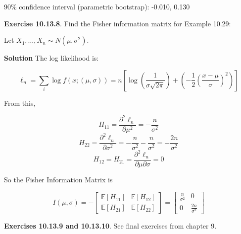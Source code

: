 \begin{console}
90\% confidence interval (parametric bootstrap):          -0.010, 0.130
\end{console}

\textbf{Exercise 10.13.8}. Find the Fisher information matrix for
Example 10.29:

Let \(X_1, \dots, X_n \sim N(\mu, \sigma^2)\).

\textbf{Solution} The log likelihood is:

\[\ell_n = \sum_i \log f(x; (\mu, \sigma))
= n \left[ \log \left( \frac{1}{\sigma \sqrt{2 \pi}} \right) + \left( -\frac{1}{2} \left(\frac{x - \mu}{\sigma} \right)^2\right) \right]\]

From this,

\[H_{11} = \frac{\partial^2 \ell_n}{\partial \mu^2} = -\frac{n}{\sigma^2}\]
\[H_{22} = \frac{\partial^2 \ell_n}{\partial \sigma^2} = -\frac{n}{\sigma^2} - \frac{n}{\sigma^2} = -\frac{2n}{\sigma^2}\]
\[H_{12} = H_{21} = \frac{\partial^2 \ell_n}{\partial \mu \partial \sigma} = 0\]

So the Fisher Information Matrix is

\[I(\mu, \sigma) = -\begin{bmatrix}
\mathbb{E}[H_{11}] & \mathbb{E}[H_{12}] \\
\mathbb{E}[H_{21}] & \mathbb{E}[H_{22}]
\end{bmatrix} = \begin{bmatrix}
\frac{n}{\sigma^2} & 0 \\
0 & \frac{2n}{\sigma^2}
\end{bmatrix}\]

\textbf{Exercises 10.13.9 and 10.13.10}. See final exercises from
chapter 9.
